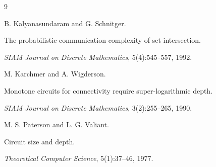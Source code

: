 \documentclass[11pt]{article}
\theoremstyle{definition}
\begin{document}







\begin{thebibliography}{9}












B. Kalyanasundaram and G. Schnitger.






The probabilistic communication complexity of set intersection.






\textit{SIAM Journal on Discrete Mathematics}, 5(4):545–557, 1992.



















M. Karchmer and A. Wigderson.






Monotone circuits for connectivity require super-logarithmic depth.






\textit{SIAM Journal on Discrete Mathematics}, 3(2):255–265, 1990.



















M. S. Paterson and L. G. Valiant.






Circuit size and depth.






\textit{Theoretical Computer Science}, 5(1):37–46, 1977.














\end{thebibliography}
\end{document}
